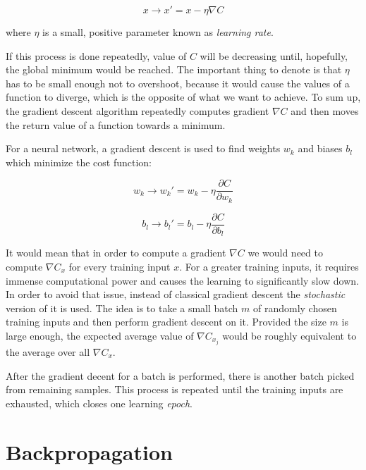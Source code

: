 \begin{equation}
x \longrightarrow x' = x - \eta \nabla C
\end{equation}

where $\eta$ is a small, positive parameter known as \emph{learning rate}.

If this process is done repeatedly, value of $C$ will be decreasing until, hopefully, the global minimum would be reached. The important thing to denote is that $\eta$ has to be small enough not to overshoot, because it would cause the values of a function to diverge, which is the opposite of what we want to achieve. To sum up, the gradient descent algorithm repeatedly computes gradient $\nabla C$ and then moves the return value of a function towards a minimum.

\newpage

For a neural network, a gradient descent is used to find weights $w_k$ and biases $b_l$ which minimize the cost function:

\begin{equation}
    w_k \longrightarrow w_k' = w_k - \eta \frac{\partial C}{\partial w_k}
\end{equation}

\begin{equation}
    b_l \longrightarrow b_l' = b_l - \eta \frac{\partial C}{\partial b_l}
\end{equation}

It would mean that in order to compute a gradient $\nabla C$ we would need to compute $\nabla C_x$ for every training input $x$. For a greater training inputs, it requires immense computational power and causes the learning to significantly slow down. In order to avoid that issue, instead of classical gradient descent the \emph{stochastic} version of it is used. The idea is to take a small batch $m$ of randomly chosen training inputs and then perform gradient descent on it. Provided the size $m$ is large enough, the expected average value of $\nabla C_{x_j}$ would be roughly equivalent to the average over all $\nabla C_x$.

After the gradient decent for a batch is performed, there is another batch picked from remaining samples. This process is repeated until the training inputs are exhausted, which closes one learning \emph{epoch}.

\section{Backpropagation}
\label{sec:backpropagation}

